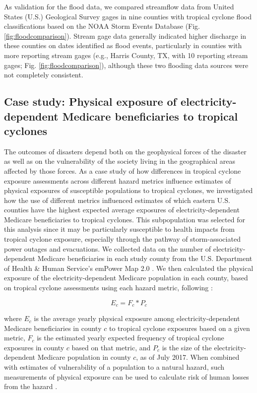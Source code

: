 \documentclass[fleqn,10pt,lineno]{olplainarticle}
\begin{document}
As validation for the flood data, we compared streamflow data from United States (U.S.) Geological Survey gages \cite{usgsgages, countyfloods, dataRetrieval} in nine counties with tropical cyclone flood classifications based on the NOAA Storm Events Database (Fig. \ref{fig:floodcomparison}). Stream gage data generally indicated higher discharge in these counties on dates identified as flood events, particularly in counties with more reporting stream gages (e.g., Harris County, TX, with 10 reporting stream gages; Fig. \ref{fig:floodcomparison}), although these two flooding data sources were not completely consistent.

\subsection*{Case study: Physical exposure of electricity-dependent Medicare beneficiaries to tropical cyclones}

The outcomes of disasters depend both on the geophysical forces of the disaster as well as on the vulnerability of the society living in the geographical areas affected by those forces.\cite{chakraborty2005population, anderson2003community, cutter1996vulnerability} As a case study of how differences in tropical cyclone exposure assessments across different hazard metrics influence estimates of physical exposures of susceptible populations to tropical cyclones, we investigated how the use of different metrics influenced estimates of which eastern U.S. counties have the highest expected average exposures of electricity-dependent Medicare beneficiaries to tropical cyclones. This subpopulation was selected for this analysis since it may be particularly susceptible to health impacts from tropical cyclone exposure, especially through the pathway of storm-associated power outages and evacuations. We collected data on the number of electricity-dependent Medicare beneficiaries in each study county from the U.S. Department of Health \& Human Service's emPower Map 2.0 \cite{empower}. We then calculated the physical exposure of the electricity-dependent Medicare population in each county, based on tropical cyclone assessments using each hazard metric, following \cite{peduzzi2009assessing}:

\begin{equation}
E_c = F_c * P_c
\end{equation}

\noindent where $E_c$ is the average yearly physical exposure among electricity-dependent Medicare beneficiaries in county $c$ to tropical cyclone exposures based on a given metric, $F_c$ is the estimated yearly expected frequency of tropical cyclone exposures in county $c$ based on that metric, and $P_c$ is the size of the electricity-dependent Medicare population in county $c$, as of July 2017. When combined with estimates of vulnerability of a population to a natural hazard, such measurements of physical exposure can be used to calculate risk of human losses from the hazard \cite{peduzzi2009assessing}.
\end{document}
